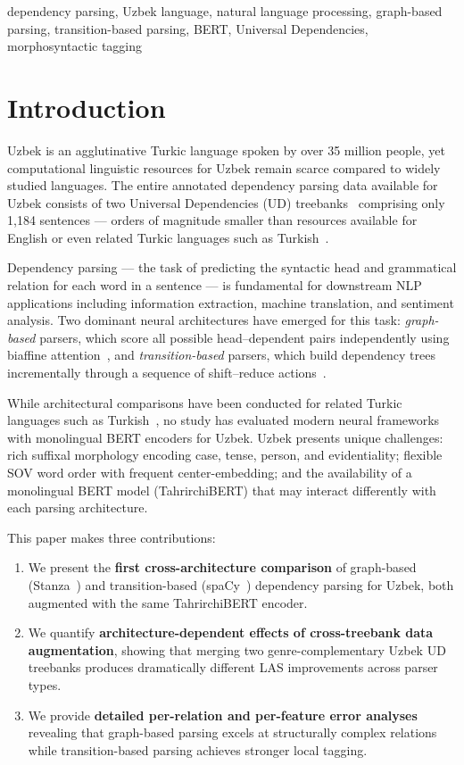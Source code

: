 \documentclass[10pt,conference,a4paper]{IEEEtran_EDM}
\begin{document}
\begin{IEEEkeywords}
dependency parsing, Uzbek language, natural language processing, graph-based parsing, transition-based parsing, BERT, Universal Dependencies, morphosyntactic tagging
\end{IEEEkeywords}

\section{Introduction}

Uzbek is an agglutinative Turkic language spoken by over 35 million people, yet computational linguistic resources for Uzbek remain scarce compared to widely studied languages. The entire annotated dependency parsing data available for Uzbek consists of two Universal Dependencies (UD) treebanks~\cite{nivre2020universal} comprising only 1,184 sentences --- orders of magnitude smaller than resources available for English or even related Turkic languages such as Turkish~\cite{sulubacak2016universal}.

Dependency parsing --- the task of predicting the syntactic head and grammatical relation for each word in a sentence --- is fundamental for downstream NLP applications including information extraction, machine translation, and sentiment analysis. Two dominant neural architectures have emerged for this task: \textit{graph-based} parsers, which score all possible head--dependent pairs independently using biaffine attention~\cite{dozat2017deep}, and \textit{transition-based} parsers, which build dependency trees incrementally through a sequence of shift--reduce actions~\cite{nivre2008algorithms}.

While architectural comparisons have been conducted for related Turkic languages such as Turkish~\cite{eryigit2008dependency}, no study has evaluated modern neural frameworks with monolingual BERT encoders for Uzbek. Uzbek presents unique challenges: rich suffixal morphology encoding case, tense, person, and evidentiality; flexible SOV word order\cite{aripovkhakimov} with frequent center-embedding; and the availability of a monolingual BERT model (TahrirchiBERT) that may interact differently with each parsing architecture.

This paper makes three contributions:
\begin{enumerate}
    \item We present the \textbf{first cross-architecture comparison} of graph-based (Stanza~\cite{qi2020stanza}) and transition-based (spaCy~\cite{honnibal2020spacy}) dependency parsing for Uzbek, both augmented with the same TahrirchiBERT encoder.
    \item We quantify \textbf{architecture-dependent effects of cross-treebank data augmentation}, showing that merging two genre-complementary Uzbek UD treebanks produces dramatically different LAS improvements across parser types.
    \item We provide \textbf{detailed per-relation and per-feature error analyses} revealing that graph-based parsing excels at structurally complex relations while transition-based parsing achieves stronger local tagging.
\end{enumerate}
\end{document}
